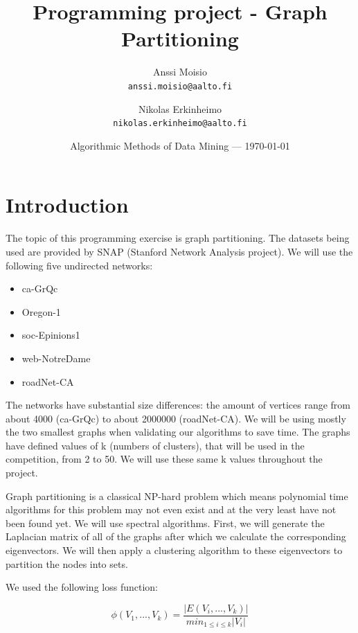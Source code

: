 \documentclass{article}
\title{Programming project - Graph Partitioning} %
\author{
  Anssi Moisio\\
  \texttt{anssi.moisio@aalto.fi}
  \and
  Nikolas Erkinheimo\\
  \texttt{nikolas.erkinheimo@aalto.fi}
}
\date{Algorithmic Methods of Data Mining --- \today} %
\begin{document}
\maketitle %


\section*{Introduction} %

The topic of this programming exercise is graph partitioning.
The datasets being used are provided by SNAP (Stanford Network Analysis project).
We will use the following five undirected networks:

\begin{itemize}
	\item ca-GrQc 
	\item Oregon-1
	\item soc-Epinions1
	\item web-NotreDame
	\item roadNet-CA
\end{itemize}

The networks have substantial size differences: the amount of vertices range from
about 4000 (ca-GrQc) to about 2000000 (roadNet-CA). We will be using mostly
the two smallest graphs when validating our algorithms to save time.
The graphs have defined values of k (numbers of clusters), that will be used in
the competition, from 2 to 50. We will use these same k values throughout the project.

Graph partitioning is a classical NP-hard problem which means polynomial time algorithms for this problem may not even exist and at the very least have not been found yet. We will use spectral algorithms. First, we will generate the Laplacian matrix of all of the graphs after which we calculate the corresponding eigenvectors. We will then apply a clustering algorithm to these eigenvectors to partition the nodes into sets.

We used the following loss function:

\begin{equation}
	\phi(V_1,...,V_k) = \frac{\lvert{E(V_i,...,V_k)}\rvert}{min_{1\leq{i}\leq{k}}\lvert{V_i}\rvert}
\end{equation}
\end{document}

